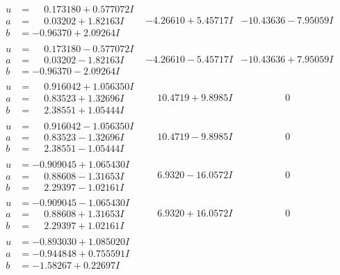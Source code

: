 \documentclass[1p]{elsarticle_modified}
\theoremstyle{definition}
\begin{document}
$$\begin{array}{c|c|c}
\begin{aligned}
u &= \phantom{-}0.173180 + 0.577072 I \\
a &= \phantom{-}0.03202 + 1.82163 I \\
b &= -0.96370 + 2.09264 I\end{aligned}
 & -4.26610 + 5.45717 I & -10.43636 - 7.95059 I \\ \hline\begin{aligned}
u &= \phantom{-}0.173180 - 0.577072 I \\
a &= \phantom{-}0.03202 - 1.82163 I \\
b &= -0.96370 - 2.09264 I\end{aligned}
 & -4.26610 - 5.45717 I & -10.43636 + 7.95059 I \\ \hline\begin{aligned}
u &= \phantom{-}0.916042 + 1.056350 I \\
a &= \phantom{-}0.83523 + 1.32696 I \\
b &= \phantom{-}2.38551 + 1.05444 I\end{aligned}
 & \phantom{-}10.4719 + 9.8985 I & \phantom{-0.000000 } 0 \\ \hline\begin{aligned}
u &= \phantom{-}0.916042 - 1.056350 I \\
a &= \phantom{-}0.83523 - 1.32696 I \\
b &= \phantom{-}2.38551 - 1.05444 I\end{aligned}
 & \phantom{-}10.4719 - 9.8985 I & \phantom{-0.000000 } 0 \\ \hline\begin{aligned}
u &= -0.909045 + 1.065430 I \\
a &= \phantom{-}0.88608 - 1.31653 I \\
b &= \phantom{-}2.29397 - 1.02161 I\end{aligned}
 & \phantom{-}6.9320 - 16.0572 I & \phantom{-0.000000 } 0 \\ \hline\begin{aligned}
u &= -0.909045 - 1.065430 I \\
a &= \phantom{-}0.88608 + 1.31653 I \\
b &= \phantom{-}2.29397 + 1.02161 I\end{aligned}
 & \phantom{-}6.9320 + 16.0572 I & \phantom{-0.000000 } 0 \\ \hline\begin{aligned}
u &= -0.893030 + 1.085020 I \\
a &= -0.944848 + 0.755591 I \\
b &= -1.58267 + 0.22697 I\end{aligned}

\end{array}$$
\end{document}
